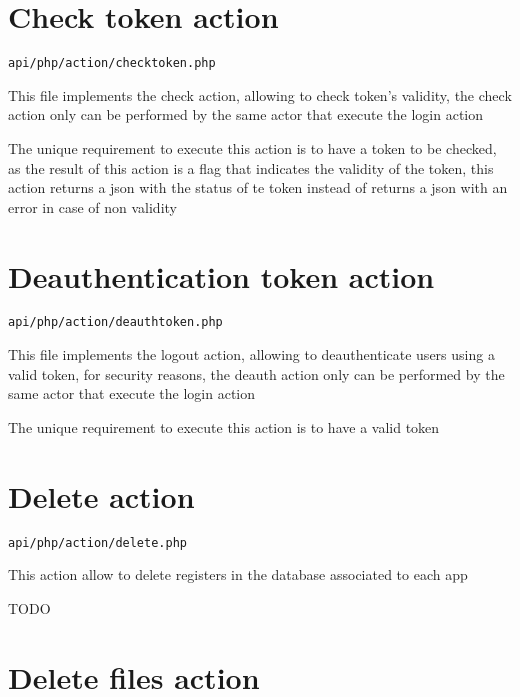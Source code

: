 \documentclass[a4paper]{book}
\begin{document}
\hypertarget{toc10}{}
\section{Check token action}

\begin{lstlisting}
api/php/action/checktoken.php
\end{lstlisting}

This file implements the check action, allowing to check token's validity, the check
action only can be performed by the same actor that execute the login action

The unique requirement to execute this action is to have a token to be checked, as the
result of this action is a flag that indicates the validity of the token, this action
returns a json with the status of te token instead of returns a json with an error in
case of non validity

\hypertarget{toc11}{}
\section{Deauthentication token action}

\begin{lstlisting}
api/php/action/deauthtoken.php
\end{lstlisting}

This file implements the logout action, allowing to deauthenticate users
using a valid token, for security reasons, the deauth action only can
be performed by the same actor that execute the login action

The unique requirement to execute this action is to have a valid token

\hypertarget{toc12}{}
\section{Delete action}

\begin{lstlisting}
api/php/action/delete.php
\end{lstlisting}

This action allow to delete registers in the database associated to
each app

TODO

\hypertarget{toc13}{}
\section{Delete files action}
\end{document}
